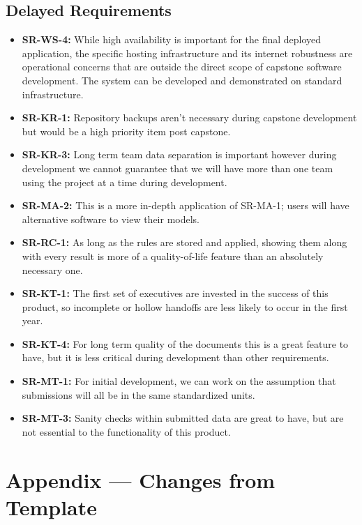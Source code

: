 \documentclass{article}
\begin{document}
\subsection{Delayed Requirements}
\begin{itemize}
    \item \textbf{SR-WS-4:} While high availability is important for the final deployed application, the specific hosting infrastructure and its internet robustness are operational concerns that are outside the direct scope of capstone software development. The system can be developed and demonstrated on standard infrastructure.
    \item \textbf{SR-KR-1:} Repository backups aren't necessary during capstone development but would be a high priority item post capstone.
    \item \textbf{SR-KR-3:} Long term team data separation is important however during development we cannot guarantee that we will have more than one team using the project at a time during development.
    \item \textbf{SR-MA-2:} This is a more in-depth application of SR-MA-1; users will have alternative software to view their models.
    \item \textbf{SR-RC-1:} As long as the rules are stored and applied, showing them along with every result is more of a quality-of-life feature than an absolutely necessary one.
    \item \textbf{SR-KT-1:} The first set of executives are invested in the success of this product, so incomplete or hollow handoffs are less likely to occur in the first year.
    \item \textbf{SR-KT-4:} For long term quality of the documents this is a great feature to have, but it is less critical during development than other requirements.
    \item \textbf{SR-MT-1:} For initial development, we can work on the assumption that submissions will all be in the same standardized units.
    \item \textbf{SR-MT-3:} Sanity checks within submitted data are great to have, but are not essential to the functionality of this product.
\end{itemize}



\newpage{}

\section{Appendix --- Changes from Template} \label{SecTemplateChanges}
\end{document}
